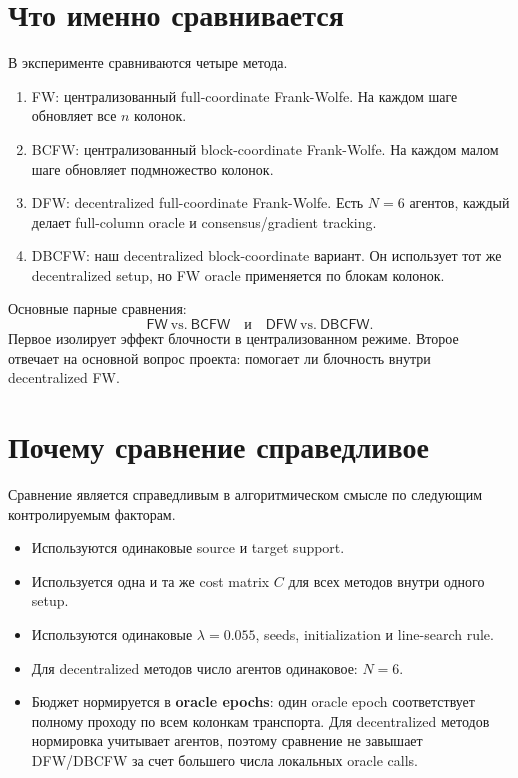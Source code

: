 \documentclass[11pt,a4paper]{article}
\newcommand{\method}[1]{\textsf{#1}}
\begin{document}
\section{Что именно сравнивается}

В эксперименте сравниваются четыре метода.
\begin{enumerate}
  \item \method{FW}: централизованный full-coordinate Frank-Wolfe. На каждом шаге обновляет все \(n\) колонок.
  \item \method{BCFW}: централизованный block-coordinate Frank-Wolfe. На каждом малом шаге обновляет подмножество колонок.
  \item \method{DFW}: decentralized full-coordinate Frank-Wolfe. Есть \(N=6\) агентов, каждый делает full-column oracle и consensus/gradient tracking.
  \item \method{DBCFW}: наш decentralized block-coordinate вариант. Он использует тот же decentralized setup, но FW oracle применяется по блокам колонок.
\end{enumerate}

Основные парные сравнения:
\[
  \method{FW}\ \text{vs.}\ \method{BCFW}
  \quad\text{и}\quad
  \method{DFW}\ \text{vs.}\ \method{DBCFW}.
\]
Первое изолирует эффект блочности в централизованном режиме. Второе отвечает на основной вопрос проекта: помогает ли блочность внутри decentralized FW.

\section{Почему сравнение справедливое}

Сравнение является справедливым в алгоритмическом смысле по следующим контролируемым факторам.
\begin{itemize}
  \item Используются одинаковые source и target support.
  \item Используется одна и та же cost matrix \(C\) для всех методов внутри одного setup.
  \item Используются одинаковые \(\lambda=0.055\), seeds, initialization и line-search rule.
  \item Для decentralized методов число агентов одинаковое: \(N=6\).
  \item Бюджет нормируется в \textbf{oracle epochs}: один oracle epoch соответствует полному проходу по всем колонкам транспорта. Для decentralized методов нормировка учитывает агентов, поэтому сравнение не завышает DFW/DBCFW за счет большего числа локальных oracle calls.
\end{itemize}
\end{document}
